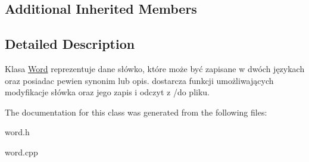 \subsection*{Additional Inherited Members}


\subsection{Detailed Description}
Klasa \mbox{\hyperlink{class_word}{Word}} reprezentuje dane słówko, które może być zapisane w dwóch językach oraz posiadac pewien synonim lub opis. dostarcza funkcji umożliwających modyfikacje słówka oraz jego zapis i odczyt z /do pliku. 

The documentation for this class was generated from the following files\+:\begin{DoxyCompactItemize}
\item 
word.\+h\item 
word.\+cpp\end{DoxyCompactItemize}
